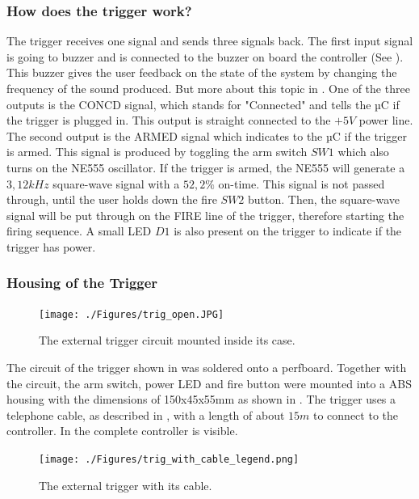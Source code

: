 \pagebreak

\subsubsection{How does the trigger work?}
The trigger receives one signal and sends three signals back. The first input signal is going to buzzer and is connected to the buzzer on board the controller (See ). This buzzer gives the user feedback on the state of the system by changing the frequency of the sound produced. But more about this topic in . One of the three outputs is the CONCD signal, which stands for "Connected" and tells the µC if the trigger is plugged in. This output is straight connected to the $+5V$ power line. The second output is the ARMED signal which indicates to the µC if the trigger is armed. This signal is produced by toggling the arm switch $SW1$ which also turns on the NE555 oscillator. If the trigger is armed, the NE555 will generate a $3,12kHz$ square-wave signal with a $52,2\%$ on-time. This signal is not passed through, until the user holds down the fire $SW2$ button. Then, the square-wave signal will be put through on the FIRE line of the trigger, therefore starting the firing sequence. A small LED $D1$ is also present on the trigger to indicate if the trigger has power.


\subsubsection{Housing of the Trigger}

\begin{figure}[!ht]
    \centering
    \texttt{[image: ./Figures/trig\_open.JPG]}
    \caption{The external trigger circuit mounted inside its case.}
    \label{fig:trig_open}     
\end{figure}

\noindent The circuit of the trigger shown in  was soldered onto a perfboard. Together with the circuit, the arm switch, power LED and fire button were mounted into a ABS housing with the dimensions of 150x45x55mm as shown in . The trigger uses a telephone cable, as described in , with a length of about $15m$ to connect to the controller. In  the complete controller is visible.

\begin{figure}[!ht]
    \centering
    \texttt{[image: ./Figures/trig\_with\_cable\_legend.png]}
    \caption{The external trigger with its cable.}
    \label{fig:trig_with_cable_legend}     
\end{figure}


